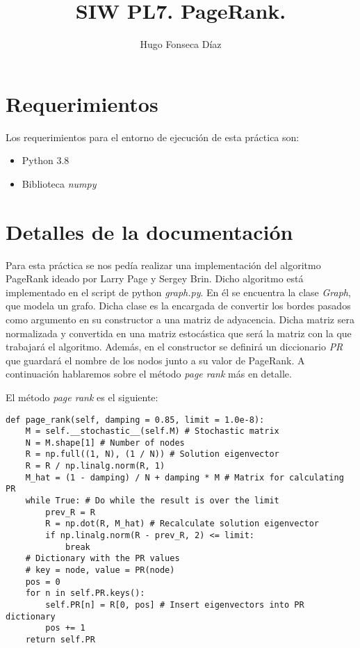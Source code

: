 \documentclass[11pt]{article}
\begin{document}
\title{SIW PL7. PageRank.}
\author{Hugo Fonseca Díaz\\ }
\maketitle
\section{Requerimientos}
Los requerimientos para el entorno de ejecución de esta práctica son:
\begin{itemize}
    \item Python 3.8
    \item Biblioteca \textit{numpy}
\end{itemize}
\section{Detalles de la documentación}
Para esta práctica se nos pedía realizar una implementación del algoritmo PageRank ideado por Larry Page y Sergey Brin. Dicho algoritmo está implementado en el script de python \textit{graph.py}. En él se encuentra la clase \textit{Graph}, que modela un grafo. Dicha clase es la encargada de convertir los bordes pasados como argumento en su constructor a una matriz de adyacencia. Dicha matriz sera normalizada y convertida en una matriz estocástica que será la matriz con la que trabajará el algoritmo. Además, en el constructor se definirá un diccionario \textit{PR} que guardará el nombre de los nodos junto a su valor de PageRank. A continuación hablaremos sobre el método \textit{page rank} más en detalle.

El método \textit{page rank} es el siguiente:

\begin{lstlisting}
def page_rank(self, damping = 0.85, limit = 1.0e-8):
    M = self.__stochastic__(self.M) # Stochastic matrix
    N = M.shape[1] # Number of nodes
    R = np.full((1, N), (1 / N)) # Solution eigenvector
    R = R / np.linalg.norm(R, 1)
    M_hat = (1 - damping) / N + damping * M # Matrix for calculating PR
    while True: # Do while the result is over the limit
        prev_R = R
        R = np.dot(R, M_hat) # Recalculate solution eigenvector
        if np.linalg.norm(R - prev_R, 2) <= limit:
            break
    # Dictionary with the PR values
    # key = node, value = PR(node)
    pos = 0
    for n in self.PR.keys():
        self.PR[n] = R[0, pos] # Insert eigenvectors into PR dictionary
        pos += 1
    return self.PR
\end{lstlisting}
\end{document}
